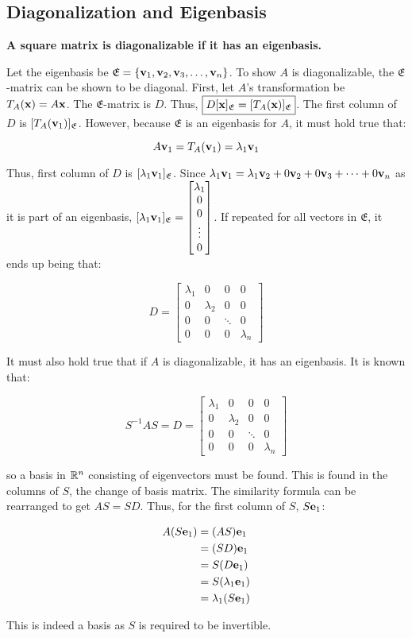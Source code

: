 \subsection{Diagonalization and Eigenbasis}

\textbf{A square matrix is diagonalizable if it has an eigenbasis.}

\noindent
Let the eigenbasis be $\mathfrak{E}=\left\{\textbf v_1, \textbf v_2, \textbf v_3, \dots, \textbf v_n\right\}$.
To show $A$ is diagonalizable, the $\mathfrak{E}$-matrix can be shown to be diagonal. First, let
$A$'s transformation be $T_A(\textbf{x})=A\textbf{x}$. The $\mathfrak{E}$-matrix is $D$. Thus, $\boxed{D[\textbf x]_\mathfrak{E}=[T_A(\textbf x)]_\mathfrak{E}}$.
The first column of $D$ is $[T_A(\textbf{v}_1)]_\mathfrak{E}$. However, because $\mathfrak{E}$ is an eigenbasis for $A$,
it must hold true that:

\[A\textbf v_1=T_A(\textbf v_1)=\lambda_1 \textbf v_1\]

\noindent
Thus, first column of $D$ is $[\lambda_1\textbf{v}_1]_\mathfrak{E}$. Since $\lambda _1 \textbf v_1=\lambda_1 \textbf v_2+0\textbf v_2+0\textbf v_3+\dots+0\textbf v_n$
as it is part of an eigenbasis, $[\lambda _1 \textbf v_1]_\mathfrak{E}=\begin{bmatrix}\lambda_1\\0\\0\\ \vdots \\ 0 \end{bmatrix}$.
If repeated for all vectors in $\mathfrak{E}$, it ends up being that:

\[D=\begin{bmatrix}\lambda_1&0&0&0\\
    0&\lambda_2&0&0\\
    0&0&\ddots&0\\
    0&0&0&\lambda_n
\end{bmatrix}\]

It must also hold true that if $A$ is diagonalizable, it has an eigenbasis. It is known that:

\[S^{-1}AS=D=\begin{bmatrix}\lambda_1&0&0&0\\0&\lambda_2&0&0\\ 0&0&\ddots&0\\ 0&0&0&\lambda_n \end{bmatrix}\]

so a basis in $\mathbb{R}^n$ consisting of eigenvectors must be found. This is found in the columns of $S$, the change of basis matrix.
The similarity formula can be rearranged to get $AS=SD$. Thus, for the first column of $S$, $S\textbf{e}_1$:

\begin{align*}
    A(S\textbf e_1)&=(AS)\textbf e_1\\
    &=(SD)\textbf e_1\\
    &=S(D \textbf e_1)\\
    &=S(\lambda_1 \textbf e_1)\\
    &=\lambda_1 (S\textbf e_1)\\    
\end{align*}

\noindent
This is indeed a basis as $S$ is required to be invertible.